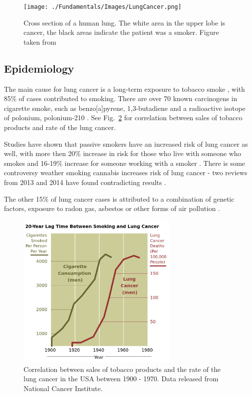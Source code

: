 \begin{figure}[H]
\begin{center}
\texttt{[image: ./Fundamentals/Images/LungCancer.png]}
\caption{Cross section of a human lung. The white area in the upper lobe is cancer, the black areas indicate the patient was a smoker. Figure taken from \cite{LungCancer}}
\label{Fig:Cancer}
\end{center}
\end{figure}


\subsection{Epidemiology}

The main cause for lung cancer is a long-term exposure to tobacco smoke \cite{Tsao2008}, with 85\% of cases contributed to smoking. There are over 70 known carcinogens in cigarette smoke, such as benzo[a]pyrene, 1,3-butadiene and a radioactive isotope of polonium, polonium-210 \cite{Hecht2012}. See Fig.~\ref{Fig:Smoking} for correlation between sales of tobacco products and rate of the lung cancer.

Studies have shown that passive smokers have an increased risk of lung cancer as well, with more then 20\% increase in risk for those who live with someone who smokes and 16-19\% increase for someone working with a smoker \cite{Taylor2007}.
There is some controversy weather smoking cannabis increases risk of lung cancer - two reviews from 2013 and 2014 have found contradicting results \cite{Tasckin2013, Underner2014}.

The other 15\% of lung cancer cases is attributed to a combination of genetic factors, exposure to radon gas, asbestos or other forms of air pollution \cite{Alberg2010}.

\begin{figure}[H]
	\begin{center}
		\includegraphics[width=0.7\textwidth]{./Fundamentals/Images/Smoking.png}
		\caption{Correlation between sales of tobacco products and the rate of the lung cancer in the USA between 1900 - 1970. Data released from National Cancer Institute.}
		\label{Fig:Smoking}
	\end{center}
\end{figure}


